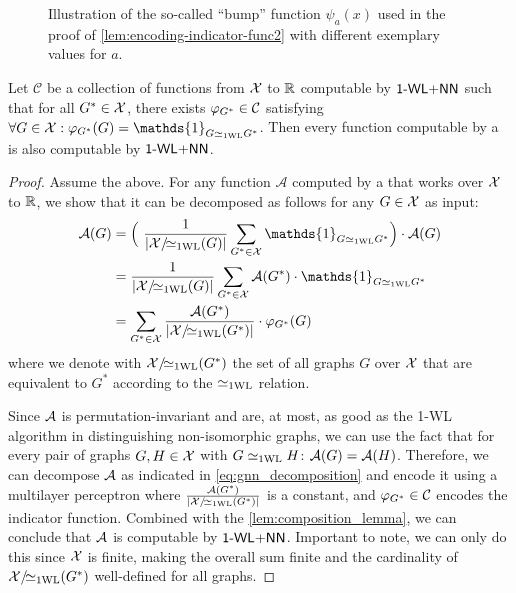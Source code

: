 \begin{figure}[H]
    \centering
    
    \caption{Illustration of the so-called ``bump'' function $\psi_a(x)$ used in the proof of \cref{lem:encoding-indicator-func2} with different exemplary values for $a$.}
    \label{fig:bump_function}
\end{figure}

\begin{lemma}\label{lem:decompose_gnn_as_wl}
    Let $\mathcal{C}$ be a collection of functions from $\mathcal{X}$ to $\mathbb{R}$ computable by $\textsf{1-WL+NN}$ such that for all $G^* \in \mathcal{X}$, there exists $\varphi_{G^*} \in \mathcal{C}$ satisfying $\forall G \in \cX: \varphi_{G^*}(G) = \mathds{1}_{G \wliso G^*}$. Then every function computable by a \gnn is also computable by $\textsf{1-WL+NN}$.
\end{lemma}

\begin{proof}
    Assume the above. For any function $\mathcal{A}$ computed by a \gnn that works over $\mathcal{X}$ to $\mathbb{R}$, we show that it can be decomposed as follows for any $G \in \mathcal{X}$ as input:
    \begin{align}\label{eq:gnn_decomposition}
        \mathcal{A}(G) &= \Bigl( \ \frac{1}{|\cX/\!{\wliso}(G)|}\sum_{G^* \in \cX} \mathds{1}_{G \wliso G^*} \Bigr) \cdot \mathcal{A}(G) \nonumber \\
        &= \frac{1}{|\cX/\!{\wliso}(G)|}\sum_{G^* \in \cX} \mathcal{A}(G^*) \cdot \mathds{1}_{G \wliso G^*} \nonumber \\
        &= \sum_{G^* \in \cX} \frac{\mathcal{A}(G^*)}{|\cX/\!{\wliso}(G^*)|}  \cdot \varphi_{G^*}(G)
    \end{align}
    where we denote with $\mathcal{X}/\!{\simeq_{\text{1WL}}}(G^*)$ the set of all graphs $G$ over $\mathcal{X}$ that are equivalent to $G^*$ according to the $\simeq_{\text{1WL}}$ relation.

    Since $\mathcal{A}$ is permutation-invariant and \gnns are, at most, as good as the 1-WL algorithm in distinguishing non-isomorphic graphs, we can use the fact that for every pair of graphs $G, H \in \mathcal{X}$ with $G \simeq_{\text{1WL}} H$: $\mathcal{A}(G) = \mathcal{A}(H)$. Therefore, we can decompose $\mathcal{A}$ as indicated in \autoref{eq:gnn_decomposition} and encode it using a multilayer perceptron where $\frac{\mathcal{A}(G^*)}{|\mathcal{X}/\!{\simeq_{\text{1WL}}}(G^*)|}$ is a constant, and $\varphi_{G^*} \in \mathcal{C}$ encodes the indicator function. Combined with the \autoref{lem:composition_lemma}, we can conclude that $\mathcal{A}$ is computable by $\textsf{1-WL+NN}$. Important to note, we can only do this since $\mathcal{X}$ is finite, making the overall sum finite and the cardinality of $\mathcal{X}/\!{\simeq_{\text{1WL}}}(G^*)$ well-defined for all graphs.
\end{proof}

